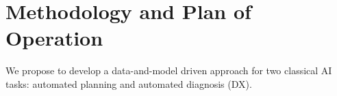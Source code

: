 \documentclass[12pt]{article}
\newcommand{\note}[1]{\textbf{\textit{#1}}}
\begin{document}
  







\section{Methodology and Plan of Operation}
\label{sec:methodology}


We propose to develop a data-and-model driven approach for two classical AI tasks: automated planning and automated diagnosis (DX). %


\end{document}
